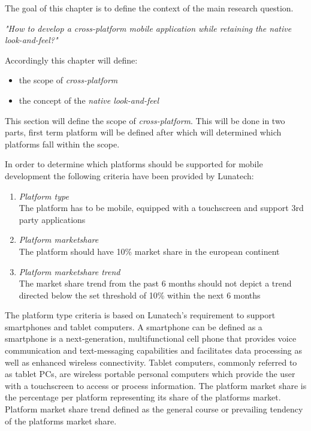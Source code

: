 The goal of this chapter is to define the context of the main research question.

\indent \emph{"How to develop a cross-platform mobile application while retaining the native look-and-feel?"}

\noindent Accordingly this chapter will define:
\begin{itemize}
\item the scope of \emph{cross-platform}
\item the concept of the \emph{native look-and-feel}
\end{itemize}

This section will define the scope of \emph{cross-platform}. This will be done in two parts, first term platform will be defined after which will determined which platforms fall within the scope.

In order to determine which platforms should be supported for mobile development the following criteria have been provided by Lunatech:

\begin{enumerate}	
\item \emph{Platform type}\\
The platform has to be mobile, equipped with a touchscreen and support 3rd party applications %
\item \emph{Platform marketshare}\\
The platform should have 10\% market share in the european continent
\item \emph{Platform marketshare trend}\\
The market share trend from the past 6 months should not depict a trend directed below the set threshold of 10\% within the next 6 months
\end{enumerate}

The platform type criteria is based on Lunatech's requirement to support smartphones and tablet computers. A smartphone can be defined as a smartphone is a next-generation, multifunctional cell phone that provides voice communication and text-messaging capabilities and facilitates data processing as well as enhanced wireless connectivity.\cite{Ni2006} Tablet computers, commonly referred to as tablet PCs, are wireless portable personal computers which provide the user with a touchscreen to access or process information.\cite{Leigh2011} The platform market share is the percentage per platform representing its share of the platforms market. Platform market share trend defined as the general course or prevailing tendency of the platforms market share.

